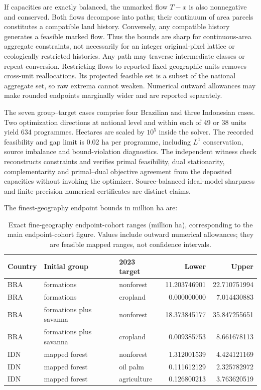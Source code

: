 If capacities are exactly balanced, the unmarked flow $T-x$ is also nonnegative and conserved. Both flows decompose into paths; their continuum of area parcels constitutes a compatible land history. Conversely, any compatible history generates a feasible marked flow. Thus the bounds are sharp for continuous-area aggregate constraints, not necessarily for an integer original-pixel lattice or ecologically restricted histories. Any path may traverse intermediate classes or repeat conversion. Restricting flows to reported fixed geographic units removes cross-unit reallocations. Its projected feasible set is a subset of the national aggregate set, so raw extrema cannot weaken. Numerical outward allowances may make rounded endpoints marginally wider and are reported separately.

The seven group--target cases comprise four Brazilian and three Indonesian cases. Two optimization directions at national level and within each of 49 or 38 units yield 634 programmes. Hectares are scaled by $10^5$ inside the solver. The recorded feasibility and gap limit is 0.02 ha per programme, including $L^1$ conservation, source imbalance and bound-violation diagnostics. The independent witness check reconstructs constraints and verifies primal feasibility, dual stationarity, complementarity and primal--dual objective agreement from the deposited capacities without invoking the optimizer. Source-balanced ideal-model sharpness and finite-precision numerical certificates are distinct claims.

The finest-geography endpoint bounds in million ha are:
\begin{table}[htbp]
\centering\small
\caption{Exact fine-geography endpoint-cohort ranges (million ha), corresponding to the main endpoint-cohort figure. Values include outward numerical allowances; they are feasible mapped ranges, not confidence intervals.}\label{tab:SI_conversion_exact}
\begin{tabularx}{\textwidth}{lllrr}\toprule
Country & Initial group & 2023 target & Lower & Upper\\\midrule
BRA & formations & nonforest & 11.203746901 & 22.710751994\\
BRA & formations & cropland & 0.000000000 & 7.014430883\\
BRA & formations plus savanna & nonforest & 18.373845177 & 35.847255651\\
BRA & formations plus savanna & cropland & 0.009385753 & 8.661678113\\
IDN & mapped forest & nonforest & 1.312001539 & 4.424121169\\
IDN & mapped forest & oil palm & 0.111612129 & 2.325782972\\
IDN & mapped forest & agriculture & 0.126800213 & 3.763620519\\
\bottomrule\end{tabularx}
\end{table}


